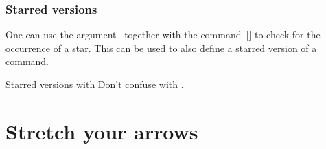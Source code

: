 \subsubsection{Starred versions}

One can use the argument~\optname{*} together with the command~[\comname] to check for the occurrence of a star.
This can be used to also define a starred version of a command.
\begin{showlatex}{Starred versions with }
Don’t confuse  with .
\end{showlatex}





\section{Stretch your arrows}

